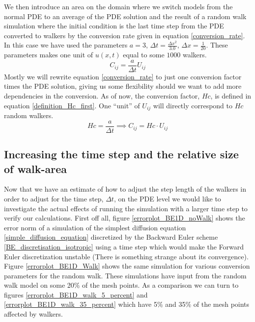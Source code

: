 
We then introduce an area on the domain where we switch models from the normal PDE to an average of the PDE solution and the result of a random walk simulation where the initial condition is the last time step from the PDE converted to walkers by the conversion rate given in equation \ref{conversion_rate}. In this case we have used the parameters $a=3$, $\Delta t = \frac{\Delta x^2}{3.0}$, $\Delta x = \frac{1}{20}$. 
These parameters makes one unit of $u(x,t)$ equal to some $1000$ walkers. 
\begin{equation}\label{conversion_rate}
 C_{ij} = \frac{a}{\Delta t}U_{ij}
\end{equation}
Mostly we will rewrite equation \ref{conversion_rate} to just one conversion factor times the PDE solution, giving us some flexibility should we want to add more dependencies in the conversion. 
As of now, the conversion factor, $Hc$, is defined in equation \ref{definition_Hc_first}. 
One ``unit'' of $ U_{ij}$ will directly correspond to $Hc$ random walkers.
\begin{equation}\label{definition_Hc_first}
 Hc =  \frac{a}{\Delta t} \implies C_{ij} = Hc\cdot U_{ij}
\end{equation}

\subsection{Increasing the time step and the relative size of walk-area}\label{increasing_dt}

Now that we have an estimate of how to adjust the step length of the walkers in order to adjust for the time step, $\Delta t$, on the PDE level we would like to investigate the actual effects of running the simulation with a larger time step to verify our calculations. 
First off all, figure \ref{errorplot_BE1D_noWalk} shows the error norm of a simulation of the simplest diffusion equation \ref{simple_diffusion_equation} discretized by the Backward Euler scheme \ref{BE_discretisation_isotropic} using a time step which would make the Forward Euler discretization unstable (There is something strange about its convergence). 
Figure \ref{errorplot_BE1D_Walk} shows the same simulation for various conversion parameters for the random walk. 
These simulations have input from the random walk model on some 20\% of the mesh points. 
As a comparison we can turn to figures \ref{errorplot_BE1D_walk_5_percent} and \ref{errorplot_BE1D_walk_35_percent} which have 5\% and 35\% of the mesh points affected by walkers.


